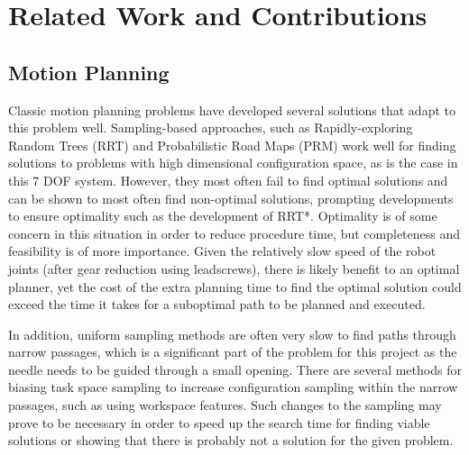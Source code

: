 \documentclass[12pt]{report}
\begin{document}
\chapter{Related Work and Contributions}
\section{Motion Planning}
\label{sec:relatedWork}
Classic motion planning problems have developed several solutions that adapt to this problem well. Sampling-based approaches, such as Rapidly-exploring Random Trees (RRT) and Probabilistic Road Maps (PRM) work well for finding solutions to problems with high dimensional configuration space, as is the case in this 7 DOF system. \cite{planningAlgorithms} However, they most often fail to find optimal solutions and can be shown to most often find non-optimal solutions, prompting developments to ensure optimality such as the development of RRT*. \cite{rrtStar} Optimality is of some concern in this situation in order to reduce procedure time, but completeness and feasibility is of more importance. Given the relatively slow speed of the robot joints (after gear reduction using leadscrews), there is likely benefit to an optimal planner, yet the cost of the extra planning time to find the optimal solution could exceed the time it takes for a suboptimal path to be planned and executed.

In addition, uniform sampling methods are often very slow to find paths through narrow passages, which is a significant part of the problem for this project as the needle needs to be guided through a small opening. There are several methods for biasing task space sampling to increase configuration sampling within the narrow passages, such as using workspace features. \cite{workspaceBiasing} Such changes to the sampling may prove to be necessary in order to speed up the search time for finding viable solutions or showing that there is probably not a solution for the given problem. 
\end{document}
